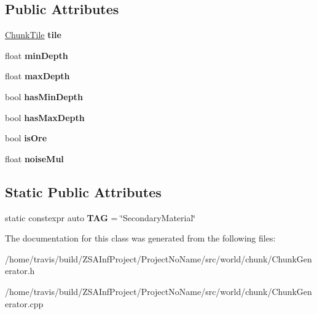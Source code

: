 \subsection*{Public Attributes}
\begin{DoxyCompactItemize}
\item 
\hypertarget{classSecondaryMaterial_a2f6dbbe3c785234d802e193e20784307}{\hyperlink{classChunkTile}{Chunk\-Tile} {\bfseries tile}}\label{classSecondaryMaterial_a2f6dbbe3c785234d802e193e20784307}

\item 
\hypertarget{classSecondaryMaterial_a13a32cb245d947c7f7a5d7e904ace8b1}{float {\bfseries min\-Depth}}\label{classSecondaryMaterial_a13a32cb245d947c7f7a5d7e904ace8b1}

\item 
\hypertarget{classSecondaryMaterial_aac62f19526e18476aba6b7ebeba41cd6}{float {\bfseries max\-Depth}}\label{classSecondaryMaterial_aac62f19526e18476aba6b7ebeba41cd6}

\item 
\hypertarget{classSecondaryMaterial_aebfb0894af42a44a46010ff6f3b45d5c}{bool {\bfseries has\-Min\-Depth}}\label{classSecondaryMaterial_aebfb0894af42a44a46010ff6f3b45d5c}

\item 
\hypertarget{classSecondaryMaterial_a91408bbd26707e4bd3f7159158d48525}{bool {\bfseries has\-Max\-Depth}}\label{classSecondaryMaterial_a91408bbd26707e4bd3f7159158d48525}

\item 
\hypertarget{classSecondaryMaterial_acb0fb055763493d6a15b04fdf6b3285b}{bool {\bfseries is\-Ore}}\label{classSecondaryMaterial_acb0fb055763493d6a15b04fdf6b3285b}

\item 
\hypertarget{classSecondaryMaterial_a8efd21aa89ac3bead26261e5812054f9}{float {\bfseries noise\-Mul}}\label{classSecondaryMaterial_a8efd21aa89ac3bead26261e5812054f9}

\end{DoxyCompactItemize}
\subsection*{Static Public Attributes}
\begin{DoxyCompactItemize}
\item 
\hypertarget{classSecondaryMaterial_ad4c8f6f600a842aa530af1bed2913343}{static constexpr auto {\bfseries T\-A\-G} = \char`\"{}Secondary\-Material\char`\"{}}\label{classSecondaryMaterial_ad4c8f6f600a842aa530af1bed2913343}

\end{DoxyCompactItemize}


The documentation for this class was generated from the following files\-:\begin{DoxyCompactItemize}
\item 
/home/travis/build/\-Z\-S\-A\-Inf\-Project/\-Project\-No\-Name/src/world/chunk/Chunk\-Generator.\-h\item 
/home/travis/build/\-Z\-S\-A\-Inf\-Project/\-Project\-No\-Name/src/world/chunk/Chunk\-Generator.\-cpp\end{DoxyCompactItemize}
